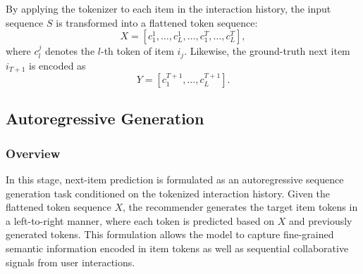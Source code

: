 By applying the tokenizer to each item in the interaction history, the input sequence $S$ is transformed into a flattened token sequence:
\begin{equation}
X = [c_1^1, \ldots, c_L^1, \ldots, c_1^{T}, \ldots, c_L^{T}],
\end{equation}
where $c_l^j$ denotes the $l$-th token of item $i_j$. Likewise, the ground-truth next item $i_{T+1}$ is encoded as
\begin{equation}
Y = [c_1^{T+1}, \ldots, c_L^{T+1}].
\end{equation}


\subsection{Autoregressive Generation}

\subsubsection{Overview}
In this stage, next-item prediction is formulated as an autoregressive sequence generation task conditioned on the tokenized interaction history. Given the flattened token sequence $X$, the recommender generates the target item tokens in a left-to-right manner, where each token is predicted based on $X$ and previously generated tokens. This formulation allows the model to capture fine-grained semantic information encoded in item tokens as well as sequential collaborative signals from user interactions.

